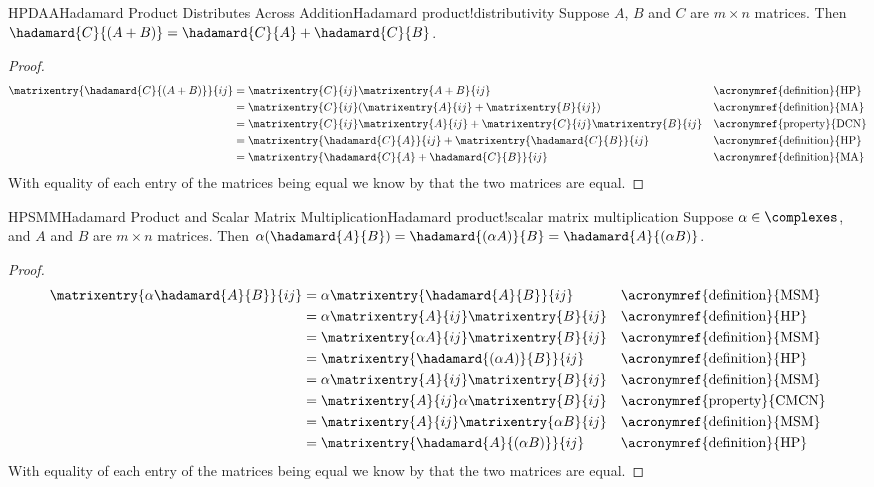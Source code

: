 %
\begin{theorem}{HPDAA}{Hadamard Product Distributes Across Addition}{Hadamard product!distributivity}
Suppose $A$, $B$ and $C$ are $m \times n$ matrices. Then $\hadamard{C}{(A + B)} = \hadamard{C}{A} + \hadamard{C}{B}$.
\end{theorem}
\begin{proof}
\begin{align*}
\matrixentry{\hadamard{C}{(A + B)}}{ij}
&=  \matrixentry{C}{ij}\matrixentry{A + B}{ij}
&& \text{\acronymref{definition}{HP}} \\
%
&=  \matrixentry{C}{ij}(\matrixentry{A}{ij} + \matrixentry{B}{ij})
&& \text{\acronymref{definition}{MA}} \\
%
&=  \matrixentry{C}{ij}\matrixentry{A}{ij} + \matrixentry{C}{ij}\matrixentry{B}{ij}
&& \text{\acronymref{property}{DCN}} \\
%
&=  \matrixentry{\hadamard{C}{A}}{ij} + \matrixentry{\hadamard{C}{B}}{ij}
&& \text{\acronymref{definition}{HP}} \\
%
&=  \matrixentry{\hadamard{C}{A} + \hadamard{C}{B}}{ij}
&& \text{\acronymref{definition}{MA}}
\end{align*}
With equality of each entry of the matrices being equal we know by  that the two matrices are equal.
\end{proof}
%
\begin{theorem}{HPSMM}{Hadamard Product and Scalar Matrix Multiplication}{Hadamard product!scalar matrix multiplication}
Suppose $\alpha \in \complexes$, and $A$ and $B$ are $m \times n$ matrices. Then $\alpha (\hadamard{A}{B}) = \hadamard{(\alpha A)}{B} = \hadamard{A}{(\alpha B)}$.
\end{theorem}
\begin{proof}
\begin{align*}
\matrixentry{\alpha \hadamard{A}{B}}{ij}
&= \alpha \matrixentry{\hadamard{A}{B}}{ij}
&& \text{\acronymref{definition}{MSM}} \\
%
&=  \alpha \matrixentry{A}{ij}\matrixentry{B}{ij}
&& \text{\acronymref{definition}{HP}} \\
%
&=  \matrixentry{\alpha A}{ij}\matrixentry{B}{ij}
&& \text{\acronymref{definition}{MSM}} \\
%
&= \matrixentry{\hadamard{(\alpha A)}{B}}{ij}
&& \text{\acronymref{definition}{HP}} \\
%
&=  \alpha \matrixentry{A}{ij}\matrixentry{B}{ij}
&& \text{\acronymref{definition}{MSM}} \\
%
&=  \matrixentry{A}{ij} \alpha \matrixentry{B}{ij}
&& \text{\acronymref{property}{CMCN}} \\
%
&=  \matrixentry{A}{ij}\matrixentry{\alpha B}{ij}
&& \text{\acronymref{definition}{MSM}}\\
%
&=  \matrixentry{\hadamard{A}{(\alpha B)}}{ij}
&& \text{\acronymref{definition}{HP}}
\end{align*}
With equality of each entry of the matrices being equal we know by  that the two matrices are equal.
\end{proof}

